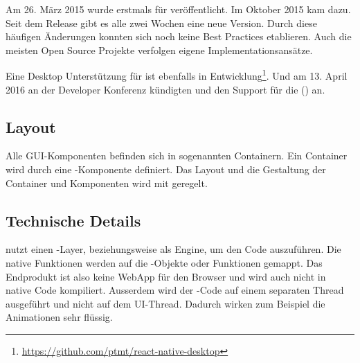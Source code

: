 Am 26. März 2015 wurde  erstmals für  veröffentlicht.
Im Oktober 2015 kam  dazu.\cite{react-native-release}
Seit dem Release gibt es alle zwei Wochen eine neue Version. 
Durch diese häufigen Änderungen konnten sich noch keine Best Practices etablieren. 
Auch die meisten Open Source Projekte verfolgen eigene Implementationsansätze.

Eine Desktop Unterstützung für  ist ebenfalls in Entwicklung\footnote{\url{https://github.com/ptmt/react-native-desktop}}. 
Und am 13. April 2016 an der  Developer Konferenz kündigten  und  den Support für die  () an.\cite{react-native-windows}


\subsection{Layout}
Alle \gls{GUI}-Komponenten befinden sich in sogenannten Containern. 
Ein Container wird durch eine -Komponente definiert. 
Das Layout und die Gestaltung der Container und Komponenten wird mit  geregelt. 

\subsection{Technische Details}
 nutzt einen -Layer, beziehungsweise  als Engine, um den Code auszuführen.\cite{react-native-javascriptcore} 
Die native Funktionen werden auf die -Objekte oder Funktionen gemappt. 
Das Endprodukt ist also keine \gls{WebApp} für den Browser und wird auch nicht in native Code kompiliert. 
Ausserdem wird der -Code auf einem separaten Thread ausgeführt und nicht auf dem UI-Thread. 
Dadurch wirken zum Beispiel die Animationen sehr flüssig.\cite{react-native-javascript-thread}


